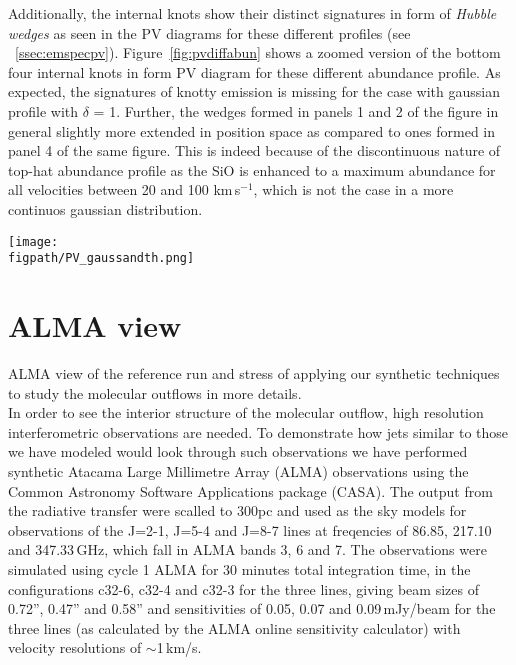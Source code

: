 \documentclass[useAMS,usenatbib,letters]{mn2e}
\newcommand{\figpath}{PFIGS/}
\begin{document}
Additionally, the internal knots show their distinct signatures in
form of {\em Hubble wedges} as seen in the PV diagrams for these
different profiles (see
~\ref{ssec:emspecpv}). Figure~\ref{fig:pvdiffabun} shows a zoomed
version of the bottom four internal knots in form PV diagram for these
different abundance profile. As expected, the signatures of knotty
emission is missing for the case with gaussian profile with $\delta$ =
1. Further, the wedges formed in panels 1 and 2 of the figure in
general slightly more extended in position space as compared to ones
formed in panel 4 of the same figure. This is indeed because of the
discontinuous nature of top-hat abundance profile as the SiO is
enhanced to a maximum abundance for all velocities between 20 and 100
km\,s$^{-1}$, which is not the case in a more continuos gaussian
distribution.

\begin{figure*}
 \texttt{[image: \\figpath/PV\_gaussandth.png]}
 \caption{Contour maps of position-velocity diagram for the internal
   knots for 2-$>$1 SiO emission for runs with molecular
   cooling having $\eta$ = 3 and $\beta$ = 10 and different abundance
   profiles. The contours mark different levels of emission in Kelvins, viz.,
   0.2,0.6,1.0,1.4,1.8,2.0,3.0,4.0.}
\label{fig:pvdiffabun}
\end{figure*}
   
 
\section{ALMA view}
ALMA view of the reference run and stress of applying our synthetic techniques
to study the molecular outflows in more details.\\

In order to see the interior structure of the molecular outflow, high resolution interferometric observations are needed. To demonstrate how jets similar to those we have modeled would look through such observations we have performed synthetic Atacama Large Millimetre Array (ALMA) observations using the Common Astronomy Software Applications package (CASA). The output from the radiative transfer were scalled to 300pc and used as the sky models for observations of the J=2-1, J=5-4 and J=8-7 lines at freqencies of 86.85, 217.10 and 347.33$\,$GHz, which fall in ALMA bands 3, 6 and 7. The observations were simulated using cycle 1 ALMA for 30 minutes total integration time, in the configurations c32-6, c32-4 and c32-3 for the three lines, giving beam sizes of 0.72'', 0.47'' and 0.58'' and sensitivities of 0.05, 0.07 and 0.09$\,$mJy/beam for the three lines (as calculated by the ALMA online sensitivity calculator) with velocity resolutions of $\sim$1$\,$km/s.
\end{document}
